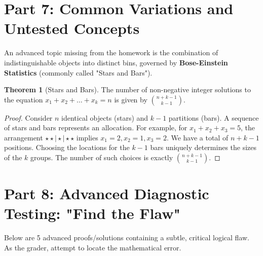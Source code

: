 \documentclass[11pt]{article}
\theoremstyle{definition}
\newtheorem{theorem}{Theorem}[section]
\begin{document}
\section{Part 7: Common Variations and Untested Concepts}

An advanced topic missing from the homework is the combination of indistinguishable objects into distinct bins, governed by \textbf{Bose-Einstein Statistics} (commonly called "Stars and Bars").

\begin{theorem}[Stars and Bars]
The number of non-negative integer solutions to the equation $x_1 + x_2 + \dots + x_k = n$ is given by $\binom{n + k - 1}{k - 1}$.
\end{theorem}
\begin{proof}
Consider $n$ identical objects (stars) and $k-1$ partitions (bars). A sequence of stars and bars represents an allocation. For example, for $x_1+x_2+x_3 = 5$, the arrangement $\star \star \mid \star \mid \star \star$ implies $x_1=2, x_2=1, x_3=2$. We have a total of $n + k - 1$ positions. Choosing the locations for the $k-1$ bars uniquely determines the sizes of the $k$ groups. The number of such choices is exactly $\binom{n+k-1}{k-1}$.
\end{proof}


\section{Part 8: Advanced Diagnostic Testing: "Find the Flaw"}

Below are 5 advanced proofs/solutions containing a subtle, critical logical flaw. As the grader, attempt to locate the mathematical error.
\end{document}
